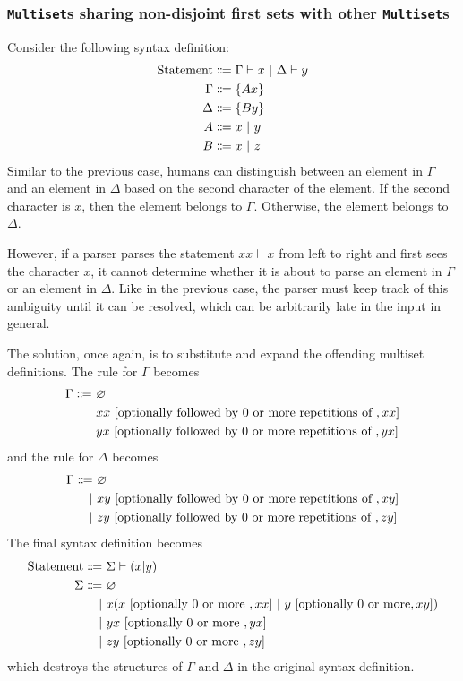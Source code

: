 \subsubsection{\texorpdfstring{\lstinline{Multiset}}{Multiset}s sharing non-disjoint first sets with other \texorpdfstring{\lstinline{Multiset}}{Multiset}s}
Consider the following syntax definition:
\begin{align*}
    \text{Statement} &\Coloneqq \Gamma \vdash x \ |\  \Delta \vdash y \\
    \Gamma &\Coloneqq \{ Ax \} \\
    \Delta &\Coloneqq \{ By \} \\
    A &\Coloneqq x \ |\  y \\
    B &\Coloneqq x \ |\  z
\end{align*}
Similar to the previous case, humans can distinguish between an element in $\Gamma$ and an element in $\Delta$ based on the second character of the element. If the second character is $x$, then the element belongs to $\Gamma$. Otherwise, the element belongs to $\Delta$.

However, if a parser parses the statement $xx \vdash x$ from left to right and first sees the character $x$, it cannot determine whether it is about to parse an element in $\Gamma$ or an element in $\Delta$. Like in the previous case, the parser must keep track of this ambiguity until it can be resolved, which can be arbitrarily late in the input in general.

The solution, once again, is to substitute and expand the offending multiset definitions. The rule for $\Gamma$ becomes
\begin{align*}
    \Gamma \Coloneqq \ &\varnothing  \\
    \ |\  &xx \ [\text{optionally followed by 0 or more repetitions of },xx] \\
    \ |\  &yx \ [\text{optionally followed by 0 or more repetitions of },yx]
\end{align*}
and the rule for $\Delta$ becomes
\begin{align*}
    \Gamma \Coloneqq \ &\varnothing  \\
    \ |\  &xy \ [\text{optionally followed by 0 or more repetitions of },xy] \\
    \ |\  &zy \ [\text{optionally followed by 0 or more repetitions of },zy]
\end{align*}
The final syntax definition becomes
\begin{align*}
    \text{Statement} \Coloneqq \ &\Sigma \vdash (x|y) \\
    \Sigma \Coloneqq \ &\varnothing \\
    \alt &x (x \ [\text{optionally 0 or more },xx] \alt y \ [\text{optionally 0 or more},xy]) \\
    \alt &yx \ [\text{optionally 0 or more },yx] \\
    \alt &zy \ [\text{optionally 0 or more },zy]
\end{align*}
which destroys the structures of $\Gamma$ and $\Delta$ in the original syntax definition.

